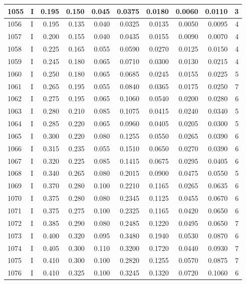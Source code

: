 \documentclass[9pt,twocolumn,twoside,]{pnas-new}
\begin{document}
\begin{tabular}{l|l|r|r|r|r|r|r|r|r}
\hline
1055 & I & 0.195 & 0.150 & 0.045 & 0.0375 & 0.0180 & 0.0060 & 0.0110 & 3\\
\hline
1056 & I & 0.195 & 0.135 & 0.040 & 0.0325 & 0.0135 & 0.0050 & 0.0095 & 4\\
\hline
1057 & I & 0.200 & 0.155 & 0.040 & 0.0435 & 0.0155 & 0.0090 & 0.0070 & 4\\
\hline
1058 & I & 0.225 & 0.165 & 0.055 & 0.0590 & 0.0270 & 0.0125 & 0.0150 & 4\\
\hline
1059 & I & 0.245 & 0.180 & 0.065 & 0.0710 & 0.0300 & 0.0130 & 0.0215 & 4\\
\hline
1060 & I & 0.250 & 0.180 & 0.065 & 0.0685 & 0.0245 & 0.0155 & 0.0225 & 5\\
\hline
1061 & I & 0.265 & 0.195 & 0.055 & 0.0840 & 0.0365 & 0.0175 & 0.0250 & 7\\
\hline
1062 & I & 0.275 & 0.195 & 0.065 & 0.1060 & 0.0540 & 0.0200 & 0.0280 & 6\\
\hline
1063 & I & 0.280 & 0.210 & 0.085 & 0.1075 & 0.0415 & 0.0240 & 0.0340 & 5\\
\hline
1064 & I & 0.285 & 0.220 & 0.065 & 0.0960 & 0.0405 & 0.0205 & 0.0300 & 5\\
\hline
1065 & I & 0.300 & 0.220 & 0.080 & 0.1255 & 0.0550 & 0.0265 & 0.0390 & 6\\
\hline
1066 & I & 0.315 & 0.235 & 0.055 & 0.1510 & 0.0650 & 0.0270 & 0.0390 & 6\\
\hline
1067 & I & 0.320 & 0.225 & 0.085 & 0.1415 & 0.0675 & 0.0295 & 0.0405 & 6\\
\hline
1068 & I & 0.340 & 0.265 & 0.080 & 0.2015 & 0.0900 & 0.0475 & 0.0550 & 5\\
\hline
1069 & I & 0.370 & 0.280 & 0.100 & 0.2210 & 0.1165 & 0.0265 & 0.0635 & 6\\
\hline
1070 & I & 0.375 & 0.280 & 0.080 & 0.2345 & 0.1125 & 0.0455 & 0.0670 & 6\\
\hline
1071 & I & 0.375 & 0.275 & 0.100 & 0.2325 & 0.1165 & 0.0420 & 0.0650 & 6\\
\hline
1072 & I & 0.385 & 0.290 & 0.080 & 0.2485 & 0.1220 & 0.0495 & 0.0650 & 7\\
\hline
1073 & I & 0.400 & 0.320 & 0.095 & 0.3480 & 0.1940 & 0.0530 & 0.0870 & 6\\
\hline
1074 & I & 0.405 & 0.300 & 0.110 & 0.3200 & 0.1720 & 0.0440 & 0.0930 & 7\\
\hline
1075 & I & 0.410 & 0.300 & 0.100 & 0.2820 & 0.1255 & 0.0570 & 0.0875 & 7\\
\hline
1076 & I & 0.410 & 0.325 & 0.100 & 0.3245 & 0.1320 & 0.0720 & 0.1060 & 6\\

\end{tabular}
\end{document}
